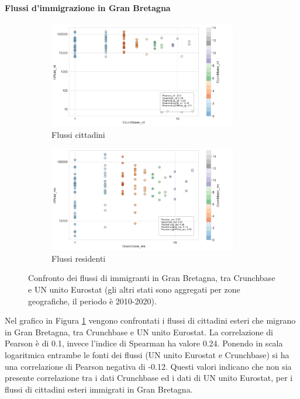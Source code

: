 \paragraph{Flussi d'immigrazione in Gran Bretagna}
\label{togbr_flows}
\begin{figure}[tb]
    \centering
    \begin{subfigure}{\textwidth}
        \centering
        \includegraphics[width=0.9\textwidth]{images/flows/aggregated/filtered_destination/gbr/Official_cit_True.png}
        \caption{Flussi cittadini}
        \label{fig:gbr_dest_true_cit}
    \end{subfigure}
    \begin{subfigure}{\textwidth}
        \centering
        \includegraphics[width=0.9\textwidth]{images/flows/aggregated/filtered_destination/gbr/Official_res_True.png}
        \caption{Flussi residenti}
        \label{fig:gbr_dest_true_res}
    \end{subfigure}
    \caption{Confronto dei flussi di immigranti in Gran Bretagna, tra Crunchbase e UN unito Eurostat (gli altri stati sono aggregati per zone geografiche, il periodo è 2010-2020).}
    \label{fig:gbr_dest_true}
\end{figure}
Nel grafico in Figura \ref{fig:gbr_dest_true_cit} vengono confrontati i flussi di cittadini esteri che migrano in Gran Bretagna, tra Crunchbase e UN unito Eurostat. La correlazione di Pearson è di 0.1, invece l'indice di Spearman ha valore 0.24. Ponendo in scala logaritmica entrambe le fonti dei flussi (UN unito Eurostat e Crunchbase) si ha una correlazione di Pearson negativa di -0.12. Questi valori indicano che non sia presente correlazione tra i dati Crunchbase ed i dati di UN unito Eurostat, per i flussi di cittadini esteri immigrati in Gran Bretagna.
